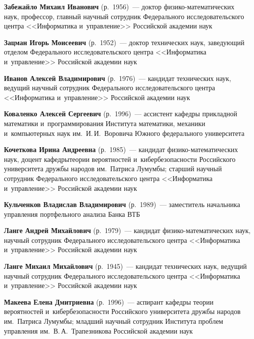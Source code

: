 \begin{multicols}{2}
\noindent
\textbf{Забежайло Михаил Иванович} (р.\ 1956)~--- доктор фи\-зи\-ко-ма\-те\-ма\-ти\-че\-ских наук, 
профессор, главный научный сотрудник Федерального исследовательского цент\-ра <<Информатика и~управ\-ле\-ние>> Российской академии наук


\noindent
\textbf{Зацман Игорь Моисеевич} (р.\ 1952)~--- 
доктор технических наук, заведующий отделом Федерального исследовательского цент\-ра <<Информатика и~управ\-ле\-ние>>
 Российской академии наук



\noindent
\textbf{Иванов Алексей Владимирович} (р.\ 1976)~--- кандидат технических наук, ведущий научный сотрудник Федерального 
исследовательского цент\-ра <<Информатика и~управ\-ле\-ние>> Российской академии наук

\noindent 
\textbf{Коваленко Алексей Сергеевич} (р.\ 1996)~--- 
ассистент ка\-фед\-ры при\-клад\-ной математики и~программирования Института математики, механики и~компьютерных наук им.\ И.\,И.~Воровича 
Южного федерального университета

\noindent
\textbf{Кочеткова Ирина Андреевна} (р.\ 1985)~--- кандидат фи\-зи\-ко-ма\-те\-ма\-ти\-че\-ских наук, 
доцент ка\-фед\-ры\linebreak тео\-рии вероятностей и~ки\-бер\-безопас\-ности Рос\-сийского университета дружбы народов им.\ Пат\-ри\-са Лумумбы; 
старший научный сотрудник Федераль\-но\-го исследовательского цент\-ра <<Информатика и~управ\-ле\-ние>> Российской академии наук

\noindent
\textbf{Кульченков Владислав Владимирович} (р.\ 1989)~--- заместитель начальника управления портфельного анализа Банка ВТБ

\noindent
\textbf{Ланге Андрей Михайлович} (р.\ 1979)~--- кандидат фи\-зи\-ко-ма\-те\-ма\-ти\-че\-ских наук, 
научный сотрудник Федерального исследовательского цент\-ра <<Информатика и~управ\-ле\-ние>> Российской академии наук

\noindent
\textbf{Ланге Михаил Михайлович} (р.\ 1945)~--- кандидат технических наук, ведущий научный сотрудник 
Федерального исследовательского цент\-ра <<Информатика и~управ\-ле\-ние>> Российской академии наук

\noindent
\textbf{Макеева Елена Дмитриевна} (р.\ 1996)~--- аспирант кафедры теории вероятностей 
и~ки\-бер\-безопас\-ности Российского университета дружбы народов им.\ Пат\-ри\-са Лумумбы; 
младший научный сотрудник Института проб\-лем управ\-ле\-ния им.\ В.\,А.~Трапезникова Российской академии наук


\end{multicols}
